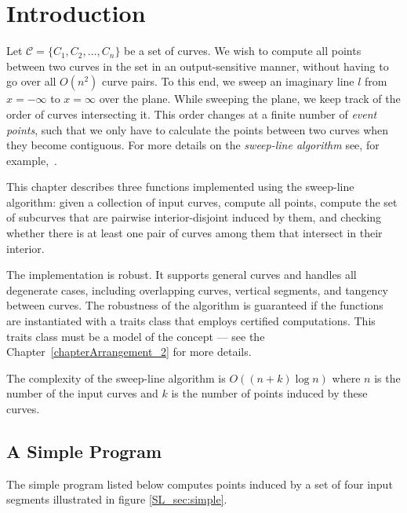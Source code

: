 \section{Introduction}

Let ${\mathcal C} = \{C_1, C_2, \ldots, C_n\}$ be a set of curves.
We wish to compute all  points between
two curves in the set in an output-sensitive manner, without having to
go over all $O(n^2)$ curve pairs. To this end, we sweep an imaginary line $l$
from $x = -\infty$ to $x = \infty$ over the plane. While sweeping
the plane, we keep track of the order of curves intersecting it.
This order changes at a finite number of \emph{event points}, such that
we only have to calculate the  points
between two curves when they become contiguous. For more details on the
\emph{sweep-line algorithm} see, for example,~\cite[Chapter~2]{bkos-cgaa-00}.

This chapter describes three functions implemented using the sweep-line
algorithm: given a collection of input curves, compute all  points,
compute the set of subcurves that are pairwise interior-disjoint induced by them,
and checking whether there is at least one pair of curves among them that intersect in their interior.

The implementation is robust. It supports general
curves and handles all degenerate cases, including overlapping curves,
vertical segments, and tangency between curves. The robustness of the
algorithm is guaranteed if the functions are instantiated with a traits
class that employs certified computations. This traits class must be a model
of the  concept --- see the
Chapter~\ref{chapterArrangement_2} for more details.

The complexity of the sweep-line algorithm is $O((n + k)\log{n})$ where $n$
is the  number of the input curves and $k$ is the number of
 points induced by these curves.

\subsection{A Simple Program}
The simple program listed below computes  points induced by 
a set of four input segments illustrated in figure \ref{SL_sec:simple}.

